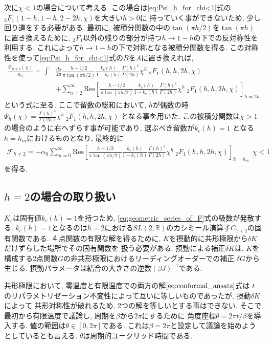 次に$\chi < 1$の場合について考える. 
この場合は\eqref{eq:Psi_h_for_chi<1}式の${}_2F_1(1-h,1-h,2-2h,\chi)$を大きい$h > 0$に
持っていく事ができないため, 少し回り道をする必要がある. 
最初に, 被積分関数の中の$\tan(\pi h/2)$を$\tan(\pi h)$に置き換えるために, 
${}_2F_1$以外の残りの部分が持つ$h\to 1-h$の下での反対称性を利用する. 
これによって$h\to 1-h$の下で対称となる被積分関数を得る. 
この対称性を使って\eqref{eq:Psi_h_for_chi<1}式の$B$を$A$に置き換えれば, 
\begin{align}
	\frac{\mathcal{F}_{h\neq 2}(\chi)}{\alpha_0}
	= \int &\frac{ds}{2\pi}\frac{h-1/2}{\pi\tan(\pi h/2)}
		\frac{k_c(h)}{1-k_c(h)}\frac{\Gamma(h)^2}{\Gamma(2h)}
		\chi^h\ {}_2F_1(h, h, 2h, \chi)\nonumber\\
	&+ \sum_{n=2}^{\infty}\mathrm{Res}\left[
		\frac{h-1/2}{\pi\tan(\pi h/2)}\frac{k_c(h)}{1-k_c(h)}\frac{\Gamma(h)^2}{\Gamma(2h)}
		\chi^h\ {}_2F_1(h, h, 2h, \chi)
	\right]_{h=2n}
\end{align}
という式に至る. 
ここで留数の総和において, $h$が偶数の時
$\Psi_h(\chi) = \frac{\Gamma(h)^2}{\Gamma(2h)}\chi^h\ {}_2F_1(h, h, 2h, \chi)$
となる事を用いた. 
この被積分関数は$\chi > 1$の場合のように右へずらす事が可能であり, 選ぶべき留数が$k_c(h)=1$
となる$h = h_m$におけるものとなり, 最終的に
\begin{align}
	\mathcal{F}_{h\neq 2} = -\alpha_0\sum_{m=0}^{\infty}\mathrm{Res}\left[
		\frac{h-1/2}{\pi\tan(\pi h/2)}\frac{k_c(h)}{1-k_c(h)}\frac{\Gamma(h)^2}{\Gamma(2h)}
		\chi^h\ {}_2F_1(h, h, 2h, \chi)
	\right]_{h=h_m}
	\hspace{5pt}\chi < 1
\end{align}
を得る. 

\subsection{$h = 2$の場合の取り扱い}
$K_c$は固有値$k_c(h) = 1$を持つため, \eqref{eq:geometric_series_of_F}式の級数が発散する. 
$k_c(h) = 1$となるのは$h = 2$における$SL(2, \mathbb{R})$のカシミール演算子$C_{1+2}$の固有関数である. 
４点関数の有限な解を得るために, $K$を摂動的に共形極限から$\delta K$だけずらした場所でその固有関数を
扱う必要がある. 
摂動による補正$\delta K$は, $K$を構成する2点関数$G$の非共形極限におけるリーディングオーダーでの補正
$\delta G$から生じる. 
摂動パラメータは結合の大きさの逆数$(\beta J)^{-1}$である. 

共形極限において, 零温度と有限温度での両方の解$\eqref{eq:conformal_ansatz}$式は
$t$のリパラメトリゼーション不変性によって互いに等しいものであったが, 摂動$\delta K$によって
共形対称性が破れるため, 2つの解を等しいとする事はできない. 
そこで最初から有限温度で議論し, 周期を$\beta$から$2\pi$にするために
角度座標$\theta = 2\pi t / \beta$を導入する. 値の範囲は$\theta \in [0, 2\pi]$である. 
これは$\beta = 2\pi$と設定して議論を始めようとしているとも言える. 
$\theta$は周期的ユークリッド時間である. 

